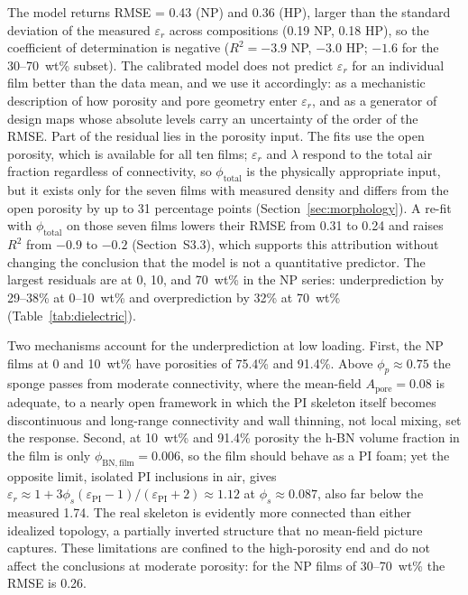\documentclass[preprint,a4paper]{elsarticle}
\newcommand{\eps}{\ensuremath{\varepsilon_r}}   %
\newcommand{\lam}{\ensuremath{\lambda}}
\newcommand{\Apore}{\ensuremath{A_{\mathrm{pore}}}}
\begin{document}
The model returns RMSE = 0.43 (NP) and 0.36 (HP), larger than the standard deviation of the measured \eps{} across compositions (0.19 NP, 0.18 HP), so the coefficient of determination is negative ($R^2 = -3.9$ NP, $-3.0$ HP; $-1.6$ for the 30--70~wt\% subset). The calibrated model does not predict \eps{} for an individual film better than the data mean, and we use it accordingly: as a mechanistic description of how porosity and pore geometry enter \eps, and as a generator of design maps whose absolute levels carry an uncertainty of the order of the RMSE. Part of the residual lies in the porosity input. The fits use the open porosity, which is available for all ten films; \eps{} and \lam{} respond to the total air fraction regardless of connectivity, so $\phi_{\mathrm{total}}$ is the physically appropriate input, but it exists only for the seven films with measured density and differs from the open porosity by up to 31 percentage points (Section~\ref{sec:morphology}). A re-fit with $\phi_{\mathrm{total}}$ on those seven films lowers their RMSE from 0.31 to 0.24 and raises $R^2$ from $-0.9$ to $-0.2$ (Section~S3.3), which supports this attribution without changing the conclusion that the model is not a quantitative predictor. The largest residuals are at 0, 10, and 70~wt\% in the NP series: underprediction by 29--38\% at 0--10~wt\% and overprediction by 32\% at 70~wt\% (Table~\ref{tab:dielectric}).

Two mechanisms account for the underprediction at low loading. First, the NP films at 0 and 10~wt\% have porosities of 75.4\% and 91.4\%. Above $\phi_p \approx 0.75$ the sponge passes from moderate connectivity, where the mean-field $\Apore = 0.08$ is adequate, to a nearly open framework in which the PI skeleton itself becomes discontinuous and long-range connectivity and wall thinning, not local mixing, set the response. Second, at 10~wt\% and 91.4\% porosity the h-BN volume fraction in the film is only $\phi_{\mathrm{BN,film}} = 0.006$, so the film should behave as a PI foam; yet the opposite limit, isolated PI inclusions in air, gives $\eps \approx 1 + 3\phi_s(\varepsilon_{\mathrm{PI}}-1)/(\varepsilon_{\mathrm{PI}}+2) \approx 1.12$ at $\phi_s \approx 0.087$, also far below the measured 1.74. The real skeleton is evidently more connected than either idealized topology, a partially inverted structure that no mean-field picture captures. These limitations are confined to the high-porosity end and do not affect the conclusions at moderate porosity: for the NP films of 30--70~wt\% the RMSE is 0.26.
\end{document}

